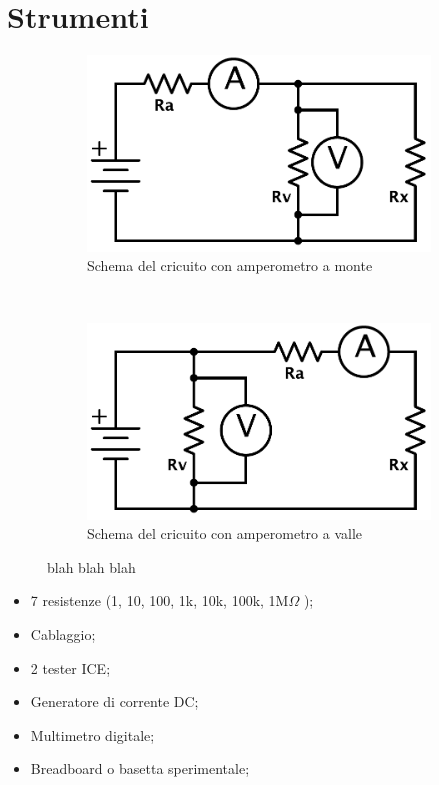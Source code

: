 \section{Strumenti}
\begin{figure}
    \centering
    \begin{subfigure}[h]{0.3\textwidth}
        \includegraphics[width=\textwidth]{R_monte.pdf}
        \caption{Schema del cricuito con amperometro a monte}
        \label{fig:monte}
    \end{subfigure}%
    ~ %
    \begin{subfigure}[h]{0.3\textwidth}
        \includegraphics[width=\textwidth]{R_valle.pdf}
        \caption{Schema del cricuito con amperometro a valle}
        \label{fig:valle}
    \end{subfigure}%
    \caption{blah blah blah}
    \label{fig:circuiti}
\end{figure}

\begin{itemize} [noitemsep]
	\item 7 resistenze (1, 10, 100, 1k, 10k, 100k, 1M$\Omega$ ); 
	\item Cablaggio;
	\item 2 tester ICE;
	\item Generatore di corrente DC;
	\item Multimetro digitale;
	\item Breadboard o basetta sperimentale;
\end{itemize}
